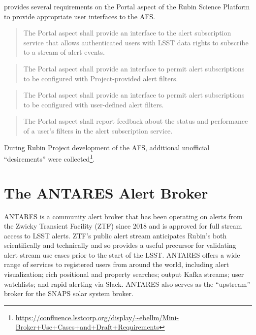 \documentclass[DM,authoryear,toc]{lsstdoc}
\begin{document}
 provides several requirements on the Portal aspect of the Rubin Science Platform to provide appropriate user interfaces to the AFS.

\begin{quote}
  The Portal aspect shall provide an interface to the alert subscription service that allows authenticated users with LSST data rights to subscribe to a stream of alert events.
\end{quote}

\begin{quote}
  The Portal aspect shall provide an interface to permit alert subscriptions to be
configured with Project-provided alert filters.
\end{quote}

\begin{quote}
  The Portal aspect shall provide an interface to permit alert subscriptions to be
  configured with user-defined alert filters. 
\end{quote}

\begin{quote}
  The Portal aspect shall report feedback about the status and performance of
a user’s filters in the alert subscription service.
\end{quote}



During Rubin Project development of the AFS, additional unofficial ``desirements'' were collected\footnote{\url{https://confluence.lsstcorp.org/display/~ebellm/Mini-Broker+Use+Cases+and+Draft+Requirements}}.

\section{The ANTARES Alert Broker} \label{sec:antares}

ANTARES is a community alert broker that has been operating on alerts from the Zwicky Transient Facility (ZTF) since 2018 and is approved for full stream access to LSST alerts.
ZTF's public alert stream anticipates Rubin's both scientifically and technically and so provides a useful precursor for validating alert stream use cases prior to the start of the LSST.
ANTARES offers a wide range of services to registered users from around the world, including alert visualization; rich positional and property searches; output Kafka streams; user watchlists; and rapid alerting via Slack.
ANTARES also serves as the ``upstream'' broker for the SNAPS solar system broker.
\end{document}
